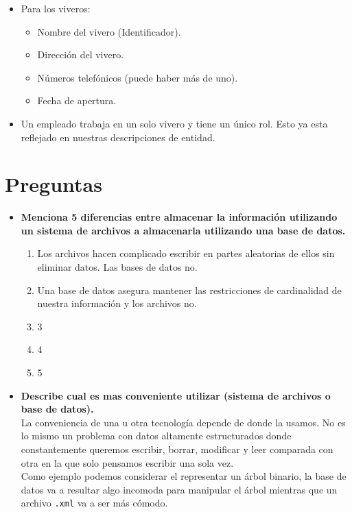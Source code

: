 \documentclass[12pt,a4paper]{article}
\begin{document}
\begin{itemize}
	\item Para los viveros:\\
		\begin{itemize}
			\item Nombre del vivero (Identificador).\\
			\item Dirección del vivero.\\
			\item Números telefónicos (puede haber más de uno).\\
			\item Fecha de apertura.\\
		\end{itemize}

	\item Un empleado trabaja en un solo vivero y tiene un único rol.
		Esto ya esta reflejado en nuestras descripciones de entidad.\\
\end{itemize}



\section{Preguntas}
\begin{itemize}
	\item \textbf{Menciona 5 diferencias entre almacenar la información
		utilizando un sistema de archivos a almacenarla utilizando una base de datos.}\\
		\begin{enumerate}
			\item Los archivos hacen complicado escribir en partes aleatorias de ellos
				sin eliminar datos. Las bases de datos no.\\

			\item Una base de datos asegura mantener las restricciones de cardinalidad
				de nuestra información y los archivos no.\\

			\item 3
			\item 4
			\item 5
		\end{enumerate}


	\item \textbf{Describe cual es mas conveniente utilizar (sistema de archivos o base de datos).}\\

		La conveniencia de una u otra tecnología depende de donde la usamos.
		No es lo mismo un problema con datos altamente estructurados donde
		constantemente queremos escribir, borrar, modificar y leer comparada
		con otra en la que solo pensamos escribir una sola vez.\\

		Como ejemplo podemos considerar el representar un árbol binario, la base de
		datos va a resultar algo incomoda para manipular el árbol mientras
		que un archivo \texttt{.xml} va a ser más cómodo.\\
\end{itemize}
\end{document}
